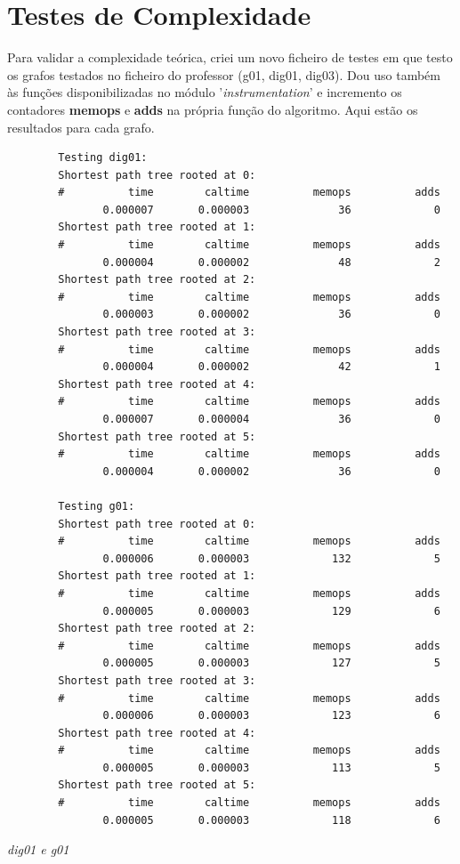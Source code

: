 \documentclass[code,math]{relatorio-deti}
\begin{document}
\section{Testes de Complexidade}

Para validar a complexidade teórica, criei um novo ficheiro de testes em que testo os grafos testados no ficheiro do professor (g01, dig01, dig03). Dou uso também às funções disponibilizadas no módulo '\textit{instrumentation}' e incremento os contadores \textbf{memops} e \textbf{adds} na própria função do algoritmo. Aqui estão os resultados para cada grafo.

\begin{listing}[H]
	\centering
	\begin{verbatim}
        Testing dig01:
        Shortest path tree rooted at 0:
        #          time	       caltime	        memops          adds
               0.000007	      0.000003	            36             0
        Shortest path tree rooted at 1:
        #          time	       caltime	        memops          adds
               0.000004	      0.000002	            48             2
        Shortest path tree rooted at 2:
        #          time	       caltime	        memops          adds
               0.000003	      0.000002	            36             0
        Shortest path tree rooted at 3:
        #          time	       caltime	        memops          adds
               0.000004	      0.000002	            42             1
        Shortest path tree rooted at 4:
        #          time	       caltime	        memops          adds
               0.000007	      0.000004	            36             0
        Shortest path tree rooted at 5:
        #          time	       caltime	        memops          adds
               0.000004	      0.000002	            36             0

        Testing g01:
        Shortest path tree rooted at 0:
        #          time	       caltime	        memops          adds
               0.000006	      0.000003	           132             5
        Shortest path tree rooted at 1:
        #          time	       caltime	        memops          adds
               0.000005	      0.000003	           129             6
        Shortest path tree rooted at 2:
        #          time	       caltime	        memops          adds
               0.000005	      0.000003	           127             5
        Shortest path tree rooted at 3:
        #          time	       caltime	        memops          adds
               0.000006	      0.000003	           123             6
        Shortest path tree rooted at 4:
        #          time	       caltime	        memops          adds
               0.000005	      0.000003	           113             5
        Shortest path tree rooted at 5:
        #          time	       caltime	        memops          adds
               0.000005	      0.000003	           118             6
    \end{verbatim}
	\caption{\textit{{dig01 e g01}}}
	\label{}
\end{listing}
\end{document}
